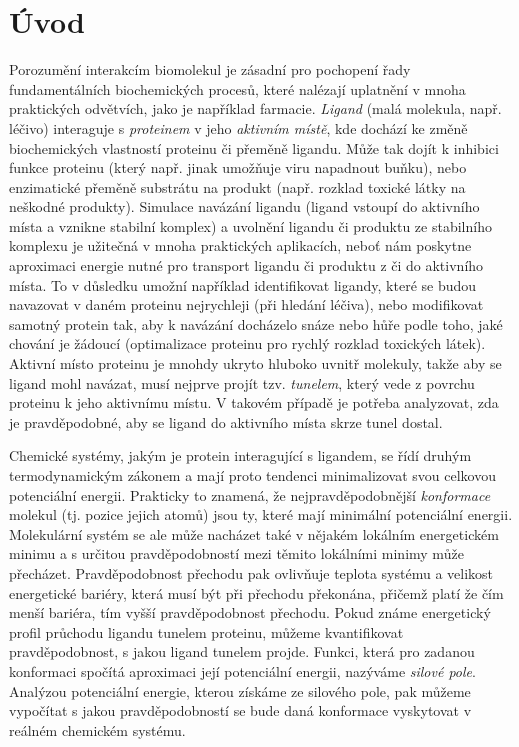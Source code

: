 \chapter*{Úvod}

Porozumění interakcím biomolekul je
zásadní pro pochopení řady fundamentálních biochemických procesů, které
nalézají uplatnění v mnoha praktických odvětvích, jako je například farmacie.
\textit{Ligand} (malá molekula, např. léčivo) interaguje s \textit{proteinem}
v jeho \textit{aktivním místě}, kde dochází ke změně biochemických vlastností proteinu
či přeměně ligandu. Může tak dojít k inhibici funkce proteinu (který např.
jinak umožňuje viru napadnout buňku), nebo enzimatické přeměně substrátu na produkt
(např. rozklad toxické látky na neškodné produkty).
Simulace navázání ligandu (ligand vstoupí
do aktivního místa a vznikne stabilní komplex) a uvolnění ligandu či produktu ze stabilního komplexu
je užitečná v mnoha praktických
aplikacích, neboť nám poskytne aproximaci energie nutné pro transport ligandu či produktu z či do aktivního místa.
To v důsledku umožní například identifikovat ligandy, které se budou navazovat
v daném proteinu nejrychleji (při hledání léčiva), nebo modifikovat samotný protein tak,
aby k navázání docházelo snáze nebo hůře podle toho, jaké chování je žádoucí (optimalizace
proteinu pro rychlý rozklad toxických látek). Aktivní
místo proteinu je mnohdy ukryto hluboko uvnitř molekuly, takže aby se ligand
mohl navázat, musí nejprve projít tzv. \textit{tunelem}, který vede z povrchu proteinu
k jeho aktivnímu místu. V takovém případě je potřeba analyzovat, zda je
pravděpodobné, aby se ligand do aktivního místa skrze tunel dostal.

Chemické systémy, jakým je protein interagující s ligandem, se řídí druhým
termodynamickým zákonem a mají proto tendenci minimalizovat svou
celkovou potenciální energii. Prakticky to znamená, že nejpravděpodobnější
\textit{konformace} molekul (tj. pozice jejich atomů) jsou ty, které mají minimální
potenciální energii. Molekulární systém se ale může nacházet také v nějakém
lokálním energetickém minimu a s určitou pravděpodobností mezi těmito lokálními
minimy může přecházet. Pravděpodobnost přechodu pak ovlivňuje teplota systému a
velikost energetické bariéry, která musí být při přechodu překonána, přičemž platí
že čím menší bariéra, tím vyšší pravděpodobnost přechodu. Pokud známe
energetický profil průchodu ligandu tunelem proteinu, můžeme kvantifikovat
pravděpodobnost, s jakou ligand tunelem projde. Funkci, která pro zadanou konformaci
spočítá aproximaci její potenciální energii, nazýváme \textit{silové pole}. Analýzou
potenciální energie, kterou získáme ze silového pole, pak můžeme vypočítat
s jakou pravděpodobností se bude daná konformace vyskytovat v reálném chemickém
systému.

